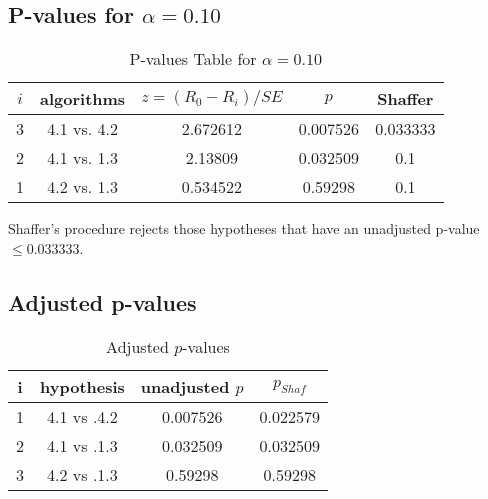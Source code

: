 \documentclass[a4paper,10pt]{article}
\begin{document}
\begin{landscape}
\pagebreak

\subsection{P-values for $\alpha=0.10$}

\begin{table}[!htp]
\centering\scriptsize
\begin{tabular}{ccccc}
$i$&algorithms&$z=(R_0 - R_i)/SE$&$p$&Shaffer\\
\hline3&4.1 vs. 4.2&2.672612&0.007526&0.033333\\
2&4.1 vs. 1.3&2.13809&0.032509&0.1\\
1&4.2 vs. 1.3&0.534522&0.59298&0.1\\
\hline
\end{tabular}
\caption{P-values Table for $\alpha=0.10$}
\end{table}Shaffer's procedure rejects those hypotheses that have an unadjusted p-value $\le0.033333$.

\pagebreak

\subsection{Adjusted p-values}

\begin{table}[!htp]
\centering\scriptsize
\begin{tabular}{cccc}
i&hypothesis&unadjusted $p$&$p_{Shaf}$\\
\hline1&4.1 vs .4.2&0.007526&0.022579\\
2&4.1 vs .1.3&0.032509&0.032509\\
3&4.2 vs .1.3&0.59298&0.59298\\
\hline
\end{tabular}
\caption{Adjusted $p$-values}
\end{table}

\end{landscape}
\end{document}
